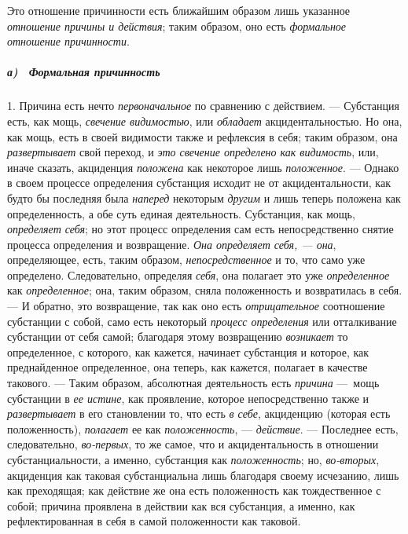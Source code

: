 Это отношение причинности есть ближайшим образом лишь указанное
{\em отношение причины и действия}; таким образом, оно
есть {\em формальное отношение причинности}.

\subparagraph[а) \ Формальная причинность]{а) \ Формальная причинность}
1. Причина есть нечто
{\em первоначальное} по сравнению с действием. —
Субстанция есть, как мощь, {\em свечение видимостью},
или {\em обладает} акцидентальностью. Но она, как мощь,
есть в своей видимости также и рефлексия в себя; таким образом, она
{\em развертывает} свой переход, и
{\em это свечение определено как видимость}, или, иначе
сказать, акциденция {\em положена} как некоторое лишь
{\em положенное}. — Однако в своем процессе определения
субстанция исходит не от акцидентальности, как будто бы последняя была
{\em наперед} некоторым
{\em другим} и лишь теперь положена как определенность,
а обе суть единая деятельность. Субстанция, как мощь,
{\em определяет себя}; но этот процесс определения сам
есть непосредственно снятие процесса определения и возвращение.
{\em Она определяет себя, — она}, определяющее, есть,
таким образом, {\em непосредственное} и то, что само
уже определено. Следовательно, определяя {\em себя},
она полагает это уже {\em определенное} как
{\em определенное}; она, таким образом, сняла
положенность и возвратилась в себя. — И обратно, это возвращение, так как
оно есть {\em отрицательное} соотношение субстанции с
собой, само есть некоторый {\em процесс определения}
или отталкивание субстанции от себя самой; благодаря этому возвращению
{\em возникает} то определенное, с которого, как
кажется, начинает субстанция и которое, как преднайденное определенное, она
теперь, как кажется, полагает в качестве такового. — Таким образом,
абсолютная деятельность есть {\em причина} —~мощь
субстанции в {\em ее истине}, как проявление, которое
непосредственно также и {\em развертывает} в его
становлении то, что есть {\em в себе}, акциденцию
(которая есть положенность), {\em полагает} ее как
{\em положенность}, —
{\em действие}. — Последнее есть, следовательно,
{\em во-первых}, то же самое, что и акцидентальность в
отношении субстанциальности, а именно, субстанция как
{\em положенность}; но,
{\em во-вторых}, акциденция как таковая субстанциальна
лишь благодаря своему исчезанию, лишь как преходящая; как действие же она
есть положенность как тождественное с собой; причина проявлена в действии
как вся субстанция, а именно, как рефлектированная в себя в самой
положенности как таковой.

